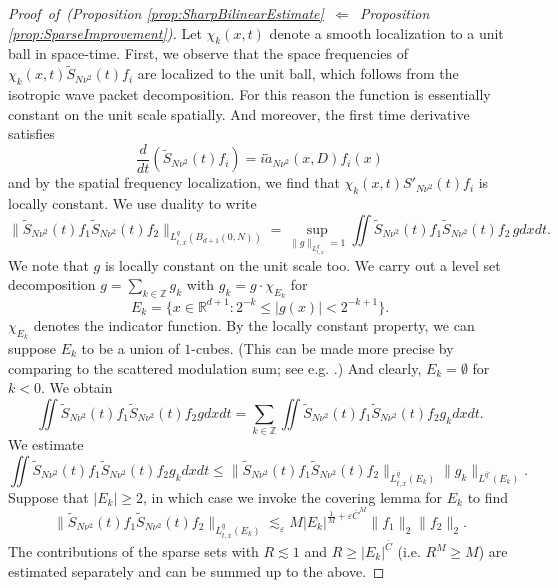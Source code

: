 \documentclass{amsart}
\numberwithin{equation}{section}
\theoremstyle{definition}
\newcommand{\R}{\mathbb{R}}
\newcommand{\Z}{\mathbb{Z}}
\begin{document}
\begin{proof}[Proof~of~(Proposition \ref{prop:SharpBilinearEstimate}~$\Leftarrow$~Proposition \ref{prop:SparseImprovement})]
    
Let $\chi_{k}(x,t)$ denote a smooth localization to a unit ball in space-time. First, we observe that the space frequencies of $\chi_k(x,t) \tilde{S}_{N \nu^2}(t) f_i$ are localized to the unit ball, which follows from the isotropic wave packet decomposition. For this reason the function is essentially constant on the unit scale spatially. And moreover, the first time derivative satisfies
\begin{equation*}
\frac{d}{dt} (\tilde{S}_{N \nu^2}(t) f_i) = i \tilde{a}_{N \nu^2}(x,D) f_i(x)
\end{equation*}
and by the spatial frequency localization, we find that $\chi_k(x,t) S'_{N \nu^2}(t) f_i$ is locally constant. We use duality to write
\begin{equation*}
\| \tilde{S}_{N \nu^2}(t) f_1 \tilde{S}_{N \nu^2}(t) f_2 \|_{L^q_{t,x}(B_{d+1}(0,N))} = \sup_{\| g \|_{L^{q'}_{t,x}} = 1} \iint \tilde{S}_{N \nu^2}(t) f_1 \tilde{S}_{N \nu^2}(t) f_2 \, g dx dt.
\end{equation*}
We note that $g$ is locally constant on the unit scale too. We carry out a level set decomposition $g = \sum_{k \in \Z} g_k$ with $g_k = g \cdot \chi_{E_k}$ for
\begin{equation*}
E_k = \{ x \in \R^{d+1} : 2^{-k} \leq |g(x)| < 2^{-k+1} \}.
\end{equation*}
$\chi_{E_k}$ denotes the indicator function. By the locally constant property, we can suppose $E_k$ to be a union of $1$-cubes. (This can be made more precise by comparing to the scattered modulation sum; see e.g. \cite[Section~2.4]{Lee2018}.) And clearly, $E_k = \emptyset$ for $k < 0$. We obtain
\begin{equation*}
\iint \tilde{S}_{N \nu^2}(t) f_1 \tilde{S}_{N \nu^2}(t) f_2 g dx dt = \sum_{k \in \Z} \iint \tilde{S}_{N \nu^2}(t) f_1 \tilde{S}_{N \nu^2}(t) f_2 g_k dx dt.
\end{equation*}
We estimate
\begin{equation*}
\iint \tilde{S}_{N \nu^2}(t) f_1 \tilde{S}_{N \nu^2}(t) f_2 g_k dx dt \leq \| \tilde{S}_{N \nu^2}(t) f_1 \tilde{S}_{N \nu^2}(t) f_2 \|_{L^{\bar{q}}_{t,x}(E_k)} \| g_k \|_{L^{\bar{q}'}(E_k)}.
\end{equation*}
Suppose that $|E_k| \geq 2$, in which case we invoke the covering lemma for $E_k$ to find
\begin{equation*}
\| \tilde{S}_{N \nu^2}(t) f_1 \tilde{S}_{N \nu^2}(t) f_2 \|_{L^{\bar{q}}_{t,x}(E_k)} \lesssim_\varepsilon M |E_k|^{\frac{1}{M}+\varepsilon \bar{C}^M} \| f_1 \|_2 \| f_2 \|_2.
\end{equation*}
The contributions of the sparse sets with $R \lesssim 1$ and $R \geq |E_k|^{\bar{C}}$ (i.e. $R^M \geq M$) are estimated separately and can be summed up to the above.


\end{proof}
\end{document}
